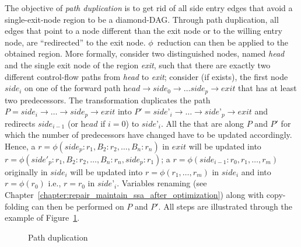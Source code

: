 The objective of \emph{path duplication} is to get rid of all side entry edges that avoid a single-exit-node region to be a diamond-DAG. 
Through path duplication, all edges that point to a node different than the exit node or to the willing entry node, are ``redirected'' to the exit node. 
$\phi$~reduction can then be applied to the obtained region. 
More formally, consider two distinguished nodes, named \textit{head} and the single exit node of the region \textit{exit}, such that there are exactly two different control-flow paths from \textit{head} to \textit{exit}; 
consider (if exists), the first node $\textit{side}_i$ on one of the forward path $\textit{head}\rightarrow \textit{side}_0\rightarrow\dots\textit{side}_p\rightarrow\textit{exit}$ that has at least two predecessors. 
The transformation duplicates the path $P=\textit{side}_i\rightarrow\dots\rightarrow\textit{side}_p\rightarrow\textit{exit}$ into $P'=\textit{side'}_i\rightarrow\dots\rightarrow\textit{side'}_p\rightarrow\textit{exit}$ and redirects $\textit{side}_{i-1}$ (or $\textit{head}$ if $i=0$) to $\textit{side'}_i$. 
All the \phifuns that are along $P$ and $P'$ for which the number of predecessors have changed have to be updated accordingly. 
Hence, a $r=\phi(\textit{side}_p:r_1,B_2:r_2,\dots,B_n:r_n)$ in $\textit{exit}$ will be updated into $r=\phi(\textit{side}'_p:r_1,B_2:r_2,\dots,B_n:r_n,\textit{side}_p:r_1)$; 
a $r=\phi(\textit{side}_{i-1}:r_0, r_1, \dots, r_m)$ originally in $\textit{side}_i$ will be updated into $r=\phi(r_1, \dots, r_m)$ in $\textit{side}_i$ and into $r=\phi(r_0)$ i.e., $r=r_0$ in $\textit{side'}_i$. 
Variables renaming (see Chapter~\ref{chapter:repair_maintain_ssa_after_optimization}) along with copy-folding can then be performed on $P$ and $P'$. 
All steps are illustrated through the example of Figure~\ref{fig:phi_aug}.


\begin{figure}[h]

  \caption{\label{fig:phi_aug}Path duplication}
\end{figure}


